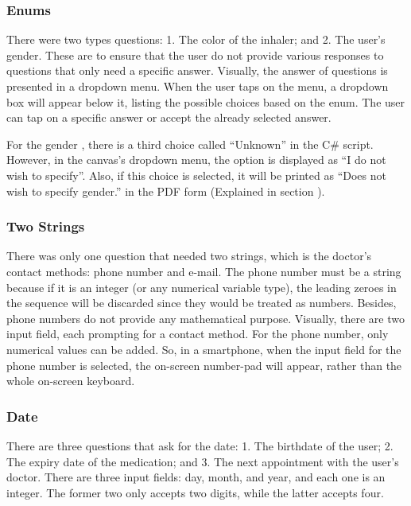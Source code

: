 \subsubsection*{Enums}
There were two types  questions: 1. The color of the inhaler; and 2. The user’s gender. These are to ensure that the user do not provide various responses to questions that only need a specific answer. Visually, the answer of  questions is presented in a dropdown menu. When the user taps on the menu, a dropdown box will appear below it, listing the possible choices based on the enum. The user can tap on a specific answer or accept the already selected answer.

For the gender , there is a third choice called “{\codefont Unknown}” in the C\# script. However, in the canvas's dropdown menu, the option is displayed as “I do not wish to specify”. Also, if this choice is selected, it will be printed as “Does not wish to specify gender.” in the PDF form (Explained in section \textbf{}).

\subsubsection*{Two Strings}
There was only one question that needed two strings, which is the doctor’s contact methods: phone number and e-mail. The phone number must be a string because if it is an integer (or any numerical variable type), the leading zeroes in the sequence will be discarded since they would be treated as numbers. Besides, phone numbers do not provide any mathematical purpose. Visually, there are two input field, each prompting for a contact method. For the phone number, only numerical values can be added. So, in a smartphone, when the input field for the phone number is selected, the on-screen number-pad will appear, rather than the whole on-screen keyboard.

\subsubsection*{Date}
There are three questions that ask for the date: 1. The birthdate of the user; 2. The expiry date of the medication; and 3. The next appointment with the user’s doctor. There are three input fields: day, month, and year, and each one is an integer. The former two only accepts two digits, while the latter accepts four.

